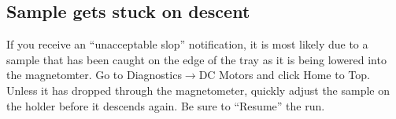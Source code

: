\documentclass[11pt,letterpaper]{article}
\begin{document}
\subsection*{Sample gets stuck on descent}
If you receive an ``unacceptable slop'' notification, it is most likely due to a sample that has been caught on the edge of the tray as it is being lowered into the magnetomter. Go to \textsf{Diagnostics}$\rightarrow$\textsf{DC Motors} and click \textsf{Home to Top}. Unless it has dropped through the magnetometer, quickly adjust the sample on the holder before it descends again. Be sure to ``Resume'' the run.

\end{document}
